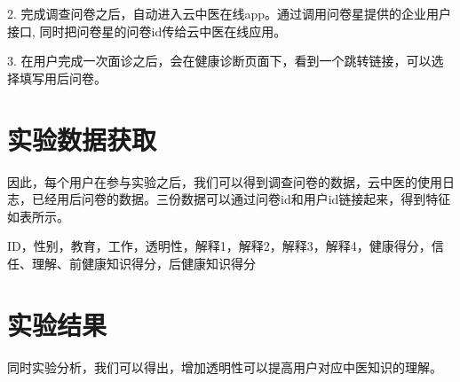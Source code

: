 2. 完成调查问卷之后，自动进入云中医在线app。通过调用问卷星提供的企业用户接口, 同时把问卷星的问卷id传给云中医在线应用。

3. 在用户完成一次面诊之后，会在健康诊断页面下，看到一个跳转链接，可以选择填写用后问卷。



\section{实验数据获取}
因此，每个用户在参与实验之后，我们可以得到调查问卷的数据，云中医的使用日志，已经用后问卷的数据。三份数据可以通过问卷id和用户id链接起来，得到特征如表所示。

ID，性别，教育，工作，透明性，解释1，解释2，解释3，解释4，健康得分，信任、理解、前健康知识得分，后健康知识得分

\section{实验结果}
同时实验分析，我们可以得出，增加透明性可以提高用户对应中医知识的理解。



